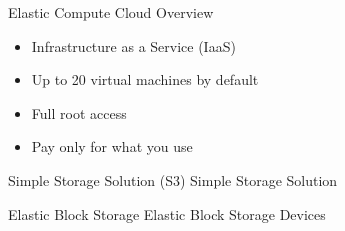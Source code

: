\begin{frame}{Elastic Compute Cloud Overview}
\begin{itemize}
  \item Infrastructure as a Service (IaaS)
  \item Up to 20 virtual machines by default
  \item Full root access
  \item Pay only for what you use
\end{itemize}
\end{frame}

\begin{frame}{Simple Storage Solution (S3)}
  Simple Storage Solution
\end{frame}

\begin{frame}{Elastic Block Storage}
  Elastic Block Storage Devices
\end{frame}

